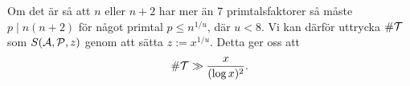 Om det är så att $n$ eller $n+2$ har mer än 7 primtalsfaktorer så måste $p\mid n(n+2)$ för något primtal $p\leq n^{1/u}$, där $u<8$.
Vi kan därför uttrycka $\card\mathcal{T}$ som $\S{A}{P}{z}$ genom att sätta $z := x^{1/u}$. Detta ger oss att
\begin{equation*}
    \card\mathcal{T} \gg \frac{x}{(\log x)^2}.
\end{equation*}






\begin{comment}

två funktioner $g_U$ och $g_L$ som uppfyller 
\begin{alignat*}{3}
    g_U(1)&=1,\quad \text{och}&\quad \mu(d)(g_U(d)-g_U(pd)) &\geq 0, \\
    g_L(1)&=1,\quad \text{och}&\quad \mu(d)(g_L(d)-g_L(pd)) &\leq 0,
\end{alignat*}






\end{comment}